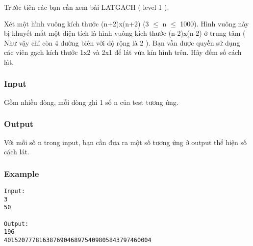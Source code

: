 



   Trước tiên các bạn cần xem bài LATGACH ( level 1 ).   


   Xét một hình vuông kích thước (n+2)x(n+2) (3 $\le$ n $\le$ 1000). Hình vuông này bị khuyết mất một diện tích là hình vuông kích thước (n-2)x(n-2) ở trung tâm ( Như vậy chỉ còn 4 đường biên với độ rộng là 2 ). Bạn vẫn được quyền sử dụng các viên gạch kích thước 1x2 và 2x1 để lát vừa kín hình trên. Hãy đếm số cách lát.  

\subsubsection{   Input  }

   Gồm nhiều dòng, mỗi dòng ghi 1 số n của test tương ứng.  

\subsubsection{   Output  }

   Với mỗi số n trong input, bạn cần đưa ra một số tương ứng ở output thể hiện số cách lát.  

\subsubsection{   Example  }
\begin{verbatim}
Input:
3
50

Output:
196
401520777816387690468975409805843797460004
\end{verbatim}
